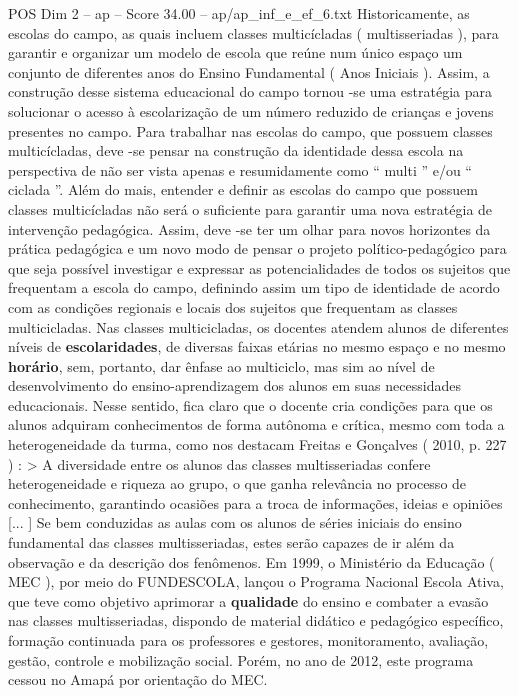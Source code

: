 \begin{textsample}{POS Dim 2 – ap – Score 34.00 – ap/ap\_inf\_e\_ef\_6.txt}
Historicamente, as escolas do campo, as quais incluem classes multicícladas ( multisseriadas ), para garantir e organizar um modelo de escola que reúne num único espaço um conjunto de diferentes anos do Ensino Fundamental ( Anos Iniciais ).
Assim, a construção desse sistema educacional do campo tornou -se uma estratégia para solucionar o acesso à escolarização de um número reduzido de crianças e jovens presentes no campo.
Para trabalhar nas escolas do campo, que possuem classes multicícladas, deve -se pensar na construção da identidade dessa escola na perspectiva de não ser vista apenas e resumidamente como “ multi ” e/ou “ ciclada ”.
Além do mais, entender e definir as escolas do campo que possuem classes multicícladas não será o suficiente para garantir uma nova estratégia de intervenção pedagógica.
Assim, deve -se ter um olhar para novos horizontes da prática pedagógica e um novo modo de pensar o projeto político-pedagógico para que seja possível investigar e expressar as potencialidades de todos os sujeitos que frequentam a escola do campo, definindo assim um tipo de identidade de acordo com as condições regionais e locais dos sujeitos que frequentam as classes multicicladas.
Nas classes multicicladas, os docentes atendem alunos de diferentes níveis de \textbf{escolaridades}, de diversas faixas etárias no mesmo espaço e no mesmo \textbf{horário}, sem, portanto, dar ênfase ao multiciclo, mas sim ao nível de desenvolvimento do ensino-aprendizagem dos alunos em suas necessidades educacionais.
Nesse sentido, fica claro que o docente cria condições para que os alunos adquiram conhecimentos de forma autônoma e crítica, mesmo com toda a heterogeneidade da turma, como nos destacam Freitas e Gonçalves ( 2010, p. 227 ) : > A diversidade entre os alunos das classes multisseriadas confere heterogeneidade e riqueza ao grupo, o que ganha relevância no processo de conhecimento, garantindo ocasiões para a troca de informações, ideias e opiniões [... ] Se bem conduzidas as aulas com os alunos de séries iniciais do ensino fundamental das classes multisseriadas, estes serão capazes de ir além da observação e da descrição dos fenômenos.
Em 1999, o Ministério da Educação ( MEC ), por meio do FUNDESCOLA, lançou o Programa Nacional Escola Ativa, que teve como objetivo aprimorar a \textbf{qualidade} do ensino e combater a evasão nas classes multisseriadas, dispondo de material didático e pedagógico específico, formação continuada para os professores e gestores, monitoramento, avaliação, gestão, controle e mobilização social.
Porém, no ano de 2012, este programa cessou no Amapá por orientação do MEC.

\end{textsample}
